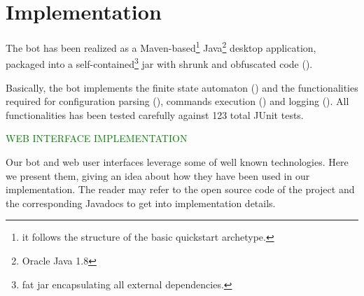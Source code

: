 \section{Implementation}
\label{sec:implementation}

The bot has been realized as a Maven-based\footnote{it follows the structure of the basic quickstart archetype.} Java\footnote{Oracle Java 1.8} desktop application, packaged into a self-contained\footnote{fat jar encapsulating all external dependencies.} jar with shrunk and obfuscated code ().

Basically, the bot implements the finite state automaton () and the functionalities required for configuration parsing (), commands execution () and logging (). All functionalities has been tested carefully against 123 total JUnit tests.

\textcolor{green}{WEB INTERFACE IMPLEMENTATION \lipsum[1]}

Our bot and web user interfaces leverage some of well known technologies. Here we present them, giving an idea about how they have been used in our implementation. The reader may refer to the open source code of the project and the corresponding Javadocs to get into implementation details.

